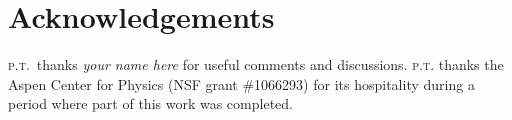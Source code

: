 \documentclass[12pt]{article}
\numberwithin{equation}{section}    %
\begin{document}
\section*{Acknowledgements}


%
\textsc{p.t.}\ thanks 
\emph{your name here}
for useful comments and discussions. 
%
\textsc{p.t.} thanks the Aspen Center for Physics (NSF grant \#1066293) for its hospitality during a period where part of this work was completed.



% 
\end{document}
